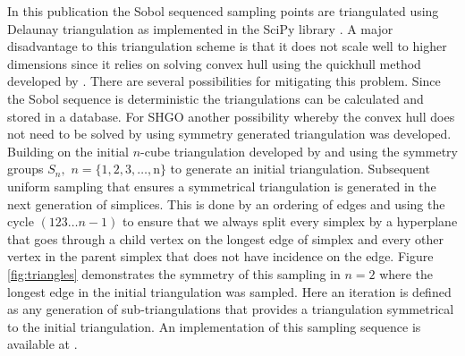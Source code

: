 In this publication the Sobol sequenced sampling points are triangulated using Delaunay triangulation as implemented in the SciPy library \cite{scipy}. A major disadvantage to this triangulation scheme is that it does not scale well to higher dimensions since it relies on solving convex hull using the quickhull method developed by \citet{Barber1996}. %
There are several possibilities for mitigating this problem. Since the Sobol sequence is deterministic the triangulations can be calculated and stored in a database. For SHGO another possibility whereby the convex hull does not need to be solved by using symmetry generated triangulation was developed. Building on the initial $n$-cube triangulation developed by \citeauthor{paulavivcius2014simplicial} \cite{paulavivcius2014simplicial, Zilinskas2016} and using the symmetry groups $S_n,$ $n = \{1, 2, 3, \dots, $n$\}$ to generate an initial triangulation. Subsequent uniform sampling that ensures a symmetrical triangulation is generated in the next generation of simplices. This is done by an ordering of edges and using the cycle $(123 \dots n-1)$ to ensure that we always split every simplex by a hyperplane that goes through a child vertex on the longest edge of simplex and every other vertex in the parent simplex that does not have incidence on the edge. Figure \ref{fig:triangles} demonstrates the symmetry of this sampling in $n=2$ where the longest edge in the initial triangulation was sampled. Here an iteration is defined as any generation of sub-triangulations that provides a triangulation symmetrical to the initial triangulation. An implementation of this sampling sequence is available at \cite{SHGOpy}.

